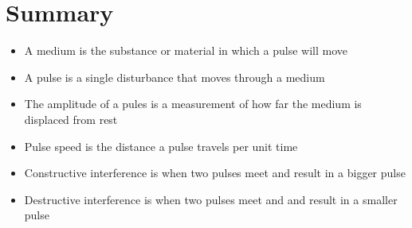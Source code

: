             \section{Summary}
            \nopagebreak
            \label{m38802*eip-404}\begin{itemize}[noitemsep]
            \item A medium is the substance or material in which a pulse will move
	    \item A pulse is a single disturbance that moves through a medium
	    \item The amplitude of a pules is a measurement of how far the medium is displaced from rest
	    \item Pulse speed is the distance a pulse travels per unit time
	    \item Constructive interference is when two pulses meet and result in a bigger pulse		
	    \item Destructive interference is when two pulses meet and and result in a smaller pulse
	    \end{itemize}
        \label{m38802*cid9}


